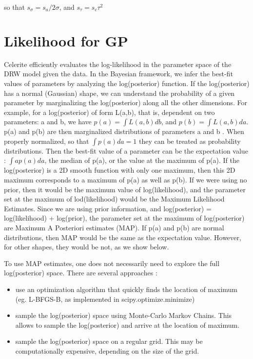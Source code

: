 \documentclass[fleqn,usenatbib]{mnras}  %
\begin{document}
so that $s_{\sigma} = s_{a} / 2 \sigma$, and $s_{\tau} = s_{c} \tau^{2}$





\section{Likelihood for GP}
Celerite efficiently evaluates the log-likelihood in the parameter space of the DRW model given the data. 
In the Bayesian framework,   we infer the best-fit  values of parameters  by analyzing the log(posterior) function. If the log(posterior) has a normal (Gaussian) shape, we can understand the probability of a given parameter by marginalizing the log(posterior) along all the other dimensions. For example, for a log(posterior) of form L(a,b), that is, dependent on two parameters: a and b,  we have $p(a)= \int{L(a,b) db}$, and $p(b) = \int{L(a,b)da}$. p(a) and p(b) are then marginalized distributions of parameters a and b . When properly normalized, so that $\int{p(a)da} = 1 $ they can be treated as probability distributions. Then the best-fit value of a parameter can be the expectation value : $\int{a p(a)da}$, the median of p(a), or the value at the maximum of p(a).  If the log(posterior) is a 2D smooth function with only one maximum, then this 2D maximum corresponds to a maximum of p(a) as well as p(b).  If we were using no prior, then it would be the maximum value of log(likelihood), and the parameter set at the maximum of lod(likelihood) would be the Maximum Likelihood Estimates.  Since we are using prior information,  and log(posterior) = log(likelihood) + log(prior), the parameter set at the maximum of log(posterior) are Maximum A Posteriori estimates (MAP). 
If p(a) and p(b) are normal distributions, then MAP would be the same as the expectation value. However, for other shapes, they would be not, as we show below.  

To use MAP estimates, one does not necessarily need to explore the full log(posterior) space. There are several approaches : 

\begin{itemize}
	\item  use an optimization algorithm that quickly finds the location of maximum (eg. L-BFGS-B, as implemented in scipy.optimize.minimize)
	\item  sample the log(posterior) space using Monte-Carlo Markov Chains.  This allows to sample the log(posterior) and arrive at the location of maximum.
	\item  sample the log(posterior) space on a regular grid. This may be computationally expensive, depending on the size of the grid. 

\end{itemize}
\end{document}
